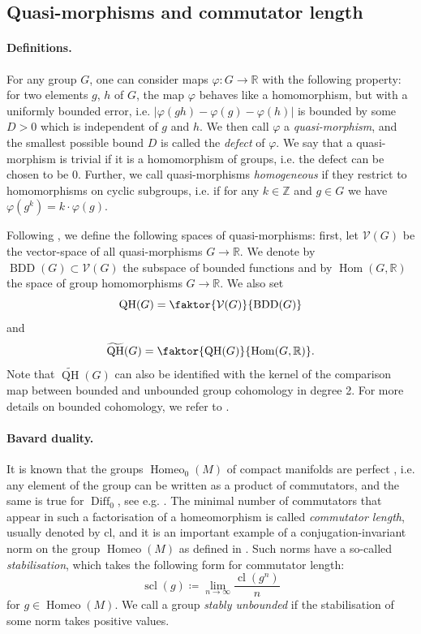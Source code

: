 \documentclass[a4paper]{article}
\let\phi\varphi %
\newcommand{\RR}{\mathbb{R}}
\newcommand{\ZZ}{\mathbb{Z}}
\begin{document}
\subsection{Quasi-morphisms and commutator length}
\paragraph{Definitions.}
For any group $G$, one can consider maps $\phi\colon G\rightarrow \RR$ with the following property:
for two elements $g$, $h$ of $G$, the map $\phi$ behaves like a homomorphism, but with a uniformly bounded error, i.e. $\lvert \phi(gh) - \phi(g) - \phi(h)\rvert$ is bounded by some $D>0$ which is independent of $g$ and $h$.
We then call $\phi$ a \emph{quasi-morphism}, and the smallest possible bound $D$ is called the \emph{defect} of $\phi$.
We say that a quasi-morphism is trivial if it is a homomorphism of groups, i.e. the defect can be chosen to be 0.
Further, we call quasi-morphisms \emph{homogeneous} if they restrict to homomorphisms on cyclic subgroups, i.e. if for any $k\in\ZZ$ and $g\in G$ we have $\phi(g^k) = k\cdot \phi(g)$.

Following \cite{Bestvina}, we define the following spaces of quasi-morphisms:
first, let $\mathcal{V}(G)$ be the vector-space of all quasi-morphisms $G\to \RR$.
We denote by $\operatorname{BDD}(G)\subset \mathcal{V}(G)$ the subspace of bounded functions and by $\operatorname{Hom}(G,\RR)$ the space of group homomorphisms $G\to \RR$.
We also set
\[ \operatorname{QH}(G) = \faktor{\mathcal{V}(G)}{\operatorname{BDD}(G)}\]
and
\[ \widetilde{\operatorname{QH}}(G) = \faktor{\operatorname{QH}(G)}{\operatorname{Hom}(G,\RR)}.\]
Note that $\widetilde{\operatorname{QH}}(G)$ can also be identified with the kernel of the comparison map between bounded and unbounded group cohomology in degree 2.
For more details on bounded cohomology, we refer to \cite{frigerio}.

\paragraph{Bavard duality.}
It is known that the groups $\operatorname{Homeo}_0(M)$ of compact manifolds are perfect \cite{anderson}, i.e. any element of the group can be written as a product of commutators, and the same is true for $\operatorname{Diff}_0$, see e.g. \cite{mann}.
The minimal number of commutators that appear in such a factorisation of a homeomorphism is called \emph{commutator length}, usually denoted by cl, and it is an important example of a conjugation-invariant norm on the group $\operatorname{Homeo}(M)$ as defined in \cite{BIP}.
Such norms have a so-called \emph{stabilisation}, which takes the following form for commutator length:
\[ \operatorname{scl}(g) \coloneqq \lim_{n\rightarrow \infty} \frac{\operatorname{cl}(g^n)}{n} \]
for $g\in \operatorname{Homeo}(M)$.
We call a group \emph{stably unbounded} if the stabilisation of some norm takes positive values.
\end{document}
